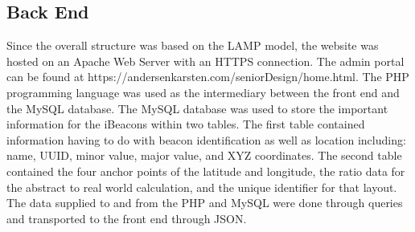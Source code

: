 \subsection{Back End}
Since the overall structure was based on the LAMP model, the website was hosted on an Apache Web Server with an HTTPS connection. The admin portal can be
found at https://andersenkarsten.com/seniorDesign/home.html. The PHP programming language was used as the intermediary between the front end and the MySQL database.
The MySQL database was used to store the important information for the iBeacons within two tables. The first table contained information having to do with beacon identification as well as location including:
name, UUID, minor value, major value, and XYZ coordinates. The second table contained the four anchor points of the latitude and longitude, the ratio data for the abstract to real world calculation, and the unique identifier for that layout.
The data supplied to and from the PHP and MySQL were done through queries and transported to the front end through JSON.
